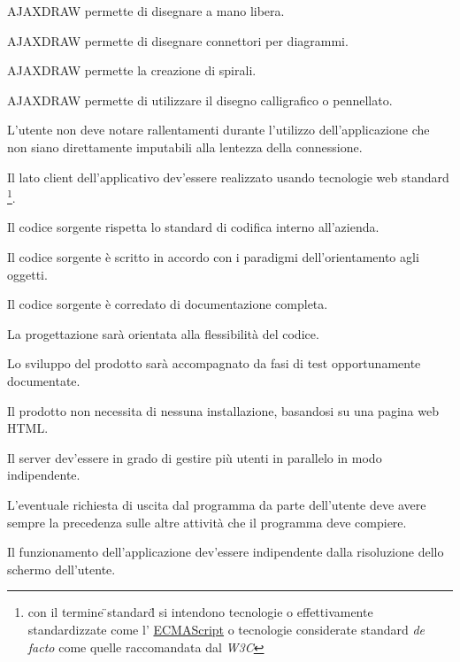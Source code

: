 \begin{elenconumerato}{\subsubsecindent}
\item{AJAXDRAW permette di disegnare a mano libera.}
\item{AJAXDRAW permette di disegnare connettori per diagrammi.}

\end{elenconumerato}

\begin{elenconumerato}{\subsubsecindent}
\item{AJAXDRAW permette la creazione di spirali.}
\item{AJAXDRAW permette di utilizzare il disegno calligrafico o pennellato.}
\end{elenconumerato}

\begin{elenconumerato}{\subsubsecindent}
\item L'utente non deve notare rallentamenti durante l'utilizzo dell'applicazione che non siano direttamente imputabili alla lentezza della connessione.
\end{elenconumerato}

\begin{elenconumerato}{\subsubsecindent}
\item Il lato client dell'applicativo dev'essere realizzato usando tecnologie web standard
\footnote{con il termine \"{}standard\" {} si intendono tecnologie o effettivamente standardizzate come l'
\underline{ECMAScript} o tecnologie considerate standard \textit{de facto} come quelle raccomandata dal \textit{W3C}}.
\item Il codice sorgente rispetta lo standard di codifica interno all'azienda.
\item Il codice sorgente \`e scritto in accordo con i paradigmi dell'orientamento agli oggetti.
\item Il codice sorgente \`e corredato di documentazione completa.
\item La progettazione sar\`a orientata alla flessibilit\`a del codice.
\item Lo sviluppo del prodotto sar\`a accompagnato da fasi di test opportunamente documentate.
\item Il prodotto non necessita di nessuna installazione, basandosi su una pagina web HTML.
\item Il server dev'essere in grado di gestire pi\`u utenti in parallelo in modo indipendente.
\item L'eventuale richiesta di uscita dal programma da parte dell'utente deve avere sempre la precedenza sulle altre attivit\`a che il programma deve compiere.
\item Il funzionamento dell'applicazione dev'essere indipendente dalla risoluzione dello schermo dell'utente.
\end{elenconumerato}

